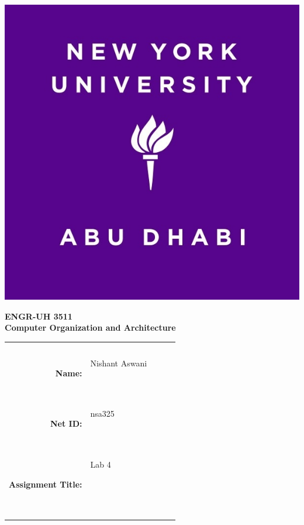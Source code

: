 \documentclass[twocolumn]{article}
\title{\myassignmenttitle}
\author{\myname, \myemail}
\affil{\myclassname (\mycoursenumber), Instructor \myinstructor}
\date{}
\newcommand{\myname}{Nishant Aswani}
\newcommand{\mynetid}{nsa325}
\newcommand{\myhwtype}{Lab }
\newcommand{\myhwnum}{4}
\newcommand{\mycoursenumber}{ENGR-UH 3511}
\newcommand{\myclassname}{Computer Organization and Architecture}
\begin{document}
\onecolumn
\pagestyle{fancy}
\fancyhf{}
\renewcommand{\headrulewidth}{0pt}

\begin{center}
  \includegraphics[scale=0.15]{etc/NYUAD-alt-logo.jpg}
\end{center}

{\vspace{2.5em}}

\begin{center}
    \Huge{\textbf{\mycoursenumber}}\\
    {\vspace{0.5em}}
    \Huge{\textbf{\myclassname}}
\end{center}

{\vspace{10em}}

\begin{center}
  \begin{tabular}{|rp{5.0cm}lll|}
    \hline
    &  &  &  & \\
    &  &  &  & \\
    \Large{\textbf{Name:}} & \Large{\myname}
    
    \  &  &  & \\
    \Large{\textbf{Net ID:}} & \Large{\mynetid}
    
    \  &  &  & \\
    \Large{\textbf{Assignment Title:}} & \Large{\myhwtype \myhwnum}
    
    \
    
    \  &  &  & \\
    \hline
  \end{tabular}
\end{center}
\end{document}
